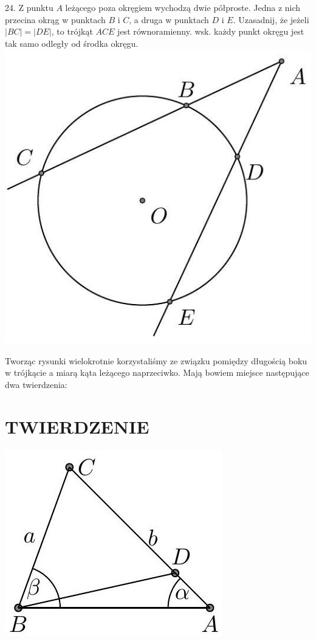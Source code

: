 \documentclass[10pt]{article}
\begin{document}
24. Z punktu \(A\) leżącego poza okręgiem wychodzą dwie półproste. Jedna z nich przecina okrąg w punktach \(B\) i \(C\), a druga w punktach \(D\) i \(E\). Uzasadnij, że jeżeli \(|B C|=|D E|\), to trójkąt \(A C E\) jest równoramienny. wsk. każdy punkt okręgu jest tak samo odległy od środka okręgu.\\
\includegraphics[max width=\textwidth, center]{2024_11_21_71f62bd117d375398909g-172(2)}

Tworząc rysunki wielokrotnie korzystaliśmy ze związku pomiędzy długością boku w trójkącie a miarą kąta leżącego naprzeciwko. Mają bowiem miejsce następujące dwa twierdzenia:

\section*{TWIERDZENIE}
\begin{center}
\includegraphics[max width=\textwidth]{2024_11_21_71f62bd117d375398909g-172}
\end{center}
\end{document}
